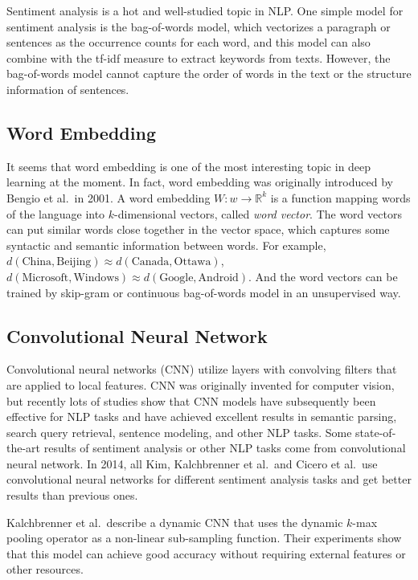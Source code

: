\documentclass[11pt]{article}
\theoremstyle{definition}
\theoremstyle{basic}
\begin{document}
Sentiment analysis is a hot and well-studied topic in NLP. One simple model for sentiment analysis is the bag-of-words model, which vectorizes a paragraph or sentences as the occurrence counts for each word, and this model can also combine with the tf-idf measure to extract keywords from texts.
However, the bag-of-words model cannot capture the order of words in the text or the structure information of sentences\cite{pennington2011semi}.

\subsection{Word Embedding}

It seems that word embedding is one of the most interesting topic in deep learning at the moment.
In fact, word embedding was originally introduced by Bengio et al.\ in 2001.
A word embedding $W : w\rightarrow \mathbb{R}^k$ is a function mapping words of the language into $k$-dimensional vectors, called \textit{word vector}.
The word vectors can put similar words close together in the vector space, which captures some syntactic and semantic information between words.
For example, $d(\mbox{China}, \mbox{Beijing}) \approx d(\mbox{Canada}, \mbox{Ottawa})$, $d(\mbox{Microsoft}, \mbox{Windows}) \approx d(\mbox{Google}, \mbox{Android})$.
And the word vectors can be trained by skip-gram or continuous bag-of-words model in an unsupervised way.


\subsection{Convolutional Neural Network}

Convolutional neural networks (CNN) utilize layers with convolving filters that are applied to local features\cite{lecun1995convolutional}.
CNN was originally invented for computer vision, but recently lots of studies show that CNN models have subsequently been effective for NLP tasks and have achieved excellent results in semantic parsing, search query retrieval, sentence modeling, and other NLP tasks.
Some state-of-the-art results of sentiment analysis or other NLP tasks come from convolutional neural network.
In 2014, all Kim, Kalchbrenner et al.\ and Cicero et al.\ use convolutional neural networks for different sentiment analysis tasks and get better results than previous ones.


Kalchbrenner et al.\cite{kalchbrenner2014convolutional}\ describe a dynamic CNN that uses the dynamic $k$-max pooling operator as a non-linear sub-sampling function.
Their experiments show that this model can achieve good accuracy without requiring external features or other resources.
\end{document}
